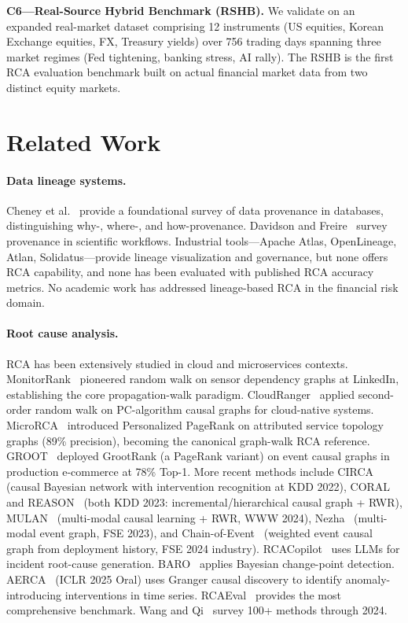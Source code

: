 \documentclass{article}
\begin{document}
\textbf{C6---Real-Source Hybrid Benchmark (RSHB).}
We validate on an expanded real-market dataset comprising 12 instruments
(US equities, Korean Exchange equities, FX, Treasury yields) over 756 trading
days spanning three market regimes (Fed tightening, banking stress, AI rally).
The RSHB is the first RCA evaluation benchmark built on actual financial market
data from two distinct equity markets.

\section{Related Work}
\label{sec:related}

\paragraph{Data lineage systems.}
Cheney et al.~\cite{cheney2009provenance} provide a foundational survey of
data provenance in databases, distinguishing why-, where-, and
how-provenance.
Davidson and Freire~\cite{davidson2008provenance} survey provenance in
scientific workflows.
Industrial tools---Apache Atlas, OpenLineage, Atlan, Solidatus---provide
lineage visualization and governance, but none offers RCA capability, and
none has been evaluated with published RCA accuracy metrics.
No academic work has addressed lineage-based RCA in the financial risk domain.

\paragraph{Root cause analysis.}
RCA has been extensively studied in cloud and microservices contexts.
MonitorRank~\cite{kim2013monitorrank} pioneered random walk on sensor dependency
graphs at LinkedIn, establishing the core propagation-walk paradigm.
CloudRanger~\cite{wang2018cloudranger} applied second-order random walk on PC-algorithm
causal graphs for cloud-native systems.
MicroRCA~\cite{wu2020microrca} introduced Personalized PageRank on attributed
service topology graphs (89\% precision), becoming the canonical graph-walk RCA reference.
GROOT~\cite{wang2021groot} deployed GrootRank (a PageRank variant) on event causal
graphs in production e-commerce at 78\% Top-1.
More recent methods include CIRCA~\cite{li2022circa} (causal Bayesian network with
intervention recognition at KDD 2022), CORAL~\cite{wang2023coral} and
REASON~\cite{wang2023reason} (both KDD 2023: incremental/hierarchical causal graph + RWR),
MULAN~\cite{zheng2024mulan} (multi-modal causal learning + RWR, WWW 2024),
Nezha~\cite{yu2023nezha} (multi-modal event graph, FSE 2023), and
Chain-of-Event~\cite{yao2024chainofevent} (weighted event causal graph from deployment
history, FSE 2024 industry).
RCACopilot~\cite{chen2024rcacopilot} uses LLMs for incident root-cause generation.
BARO~\cite{pham2024baro} applies Bayesian change-point detection.
AERCA~\cite{xiao2025aerca} (ICLR 2025 Oral) uses Granger causal discovery to
identify anomaly-introducing interventions in time series.
RCAEval~\cite{pham2025rcaeval} provides the most comprehensive benchmark.
Wang and Qi~\cite{wang2024rcasurvey} survey 100+ methods through 2024.
\end{document}

